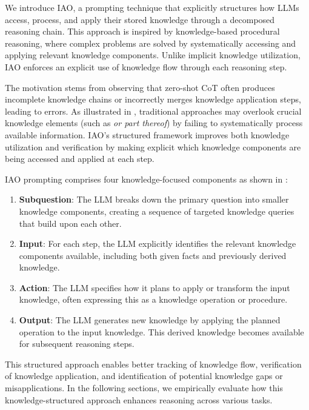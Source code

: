 We introduce IAO, a prompting technique that explicitly structures how LLMs access, process, and apply their stored knowledge through a decomposed reasoning chain. This approach is inspired by knowledge-based procedural reasoning, where complex problems are solved by systematically accessing and applying relevant knowledge components. Unlike implicit knowledge utilization, IAO enforces an explicit use of knowledge flow through each reasoning step.

The motivation stems from observing that zero-shot CoT often produces incomplete knowledge chains or incorrectly merges knowledge application steps, leading to errors. As illustrated in , 
traditional approaches may overlook crucial knowledge elements (such as \textit{or part thereof}) by failing to systematically process available information. IAO's structured framework improves both knowledge utilization and verification by making explicit which knowledge components are being accessed and applied at each step.

IAO prompting comprises four knowledge-focused components as shown in :

\begin{enumerate}
    \item \textbf{Subquestion}: The LLM breaks down the primary question into smaller knowledge components, creating a sequence of targeted knowledge queries that build upon each other.
    
    \item \textbf{Input}: For each step, the LLM explicitly identifies the relevant knowledge components available, including both given facts and previously derived knowledge.
    
    \item \textbf{Action}: The LLM specifies how it plans to apply or transform the input knowledge, often expressing this as a knowledge operation or procedure.
    
    \item \textbf{Output}: The LLM generates new knowledge by applying the planned operation to the input knowledge. This derived knowledge becomes available for subsequent reasoning steps.
\end{enumerate}

This structured approach enables better tracking of knowledge flow, verification of knowledge application, and identification of potential knowledge gaps or misapplications. In the following sections, we empirically evaluate how this knowledge-structured approach enhances reasoning across various tasks.
